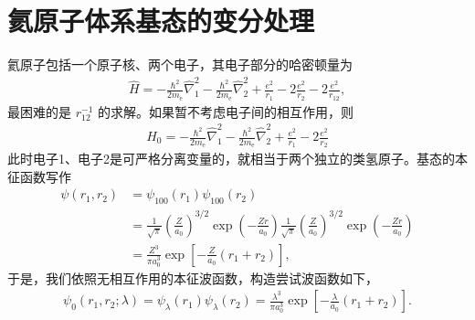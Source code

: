 \section{氦原子体系基态的变分处理}
氦原子包括一个原子核、两个电子，其电子部分的哈密顿量为
\begin{align}
    \hat H = -\frac{\hbar^2}{2m_{\mathrm{e}}} \hat\nabla_1^2 -\frac{\hbar^2}{2m_{\mathrm{e}}} \hat\nabla_2^2
    + \frac{e^2}{r_1} - 2\frac{e^2}{r_2} - 2\frac{e^2}{r_{12}},
\end{align}
最困难的是 $r_{12}^{-1}$ 的求解。如果暂不考虑电子间的相互作用，则
\begin{align}
    H_0 = -\frac{\hbar^2}{2m_{\mathrm{e}}} \hat\nabla_1^2 -\frac{\hbar^2}{2m_{\mathrm{e}}} \hat\nabla_2^2
    + \frac{e^2}{r_1} - 2\frac{e^2}{r_2}
\end{align}
此时电子1、电子2是可严格分离变量的，就相当于两个独立的类氢原子。基态的本征函数写作
\begin{align}
    \psi(r_1, r_2) &= \psi_{100}(r_1) \psi_{100}(r_2) \\
    &= \frac1{\sqrt{\pi}} \left(\frac{Z}{a_0}\right)^{3/2} \exp\!\left(-\frac{Zr}{a_0}\right) \frac1{\sqrt\pi} \left(\frac{Z}{a_0}\right)^{3/2} 
    \exp\!\left(-\frac{Zr}{a_0}\right) \\
    &= \frac{Z^3}{\pi a_0^3} \exp\!\left[-\frac Z{a_0}(r_1 + r_2)\right],
\end{align}
于是，我们依照无相互作用的本征波函数，构造尝试波函数如下，
\begin{align}
    \psi_0(r_1, r_2; \lambda) = \psi_\lambda (r_1) \psi_\lambda(r_2) =  \frac{\lambda^3}{\pi a_0^3} \exp\!\left[-\frac \lambda{a_0}(r_1 + r_2)\right]. \label{eq:he_trial}
\end{align}

